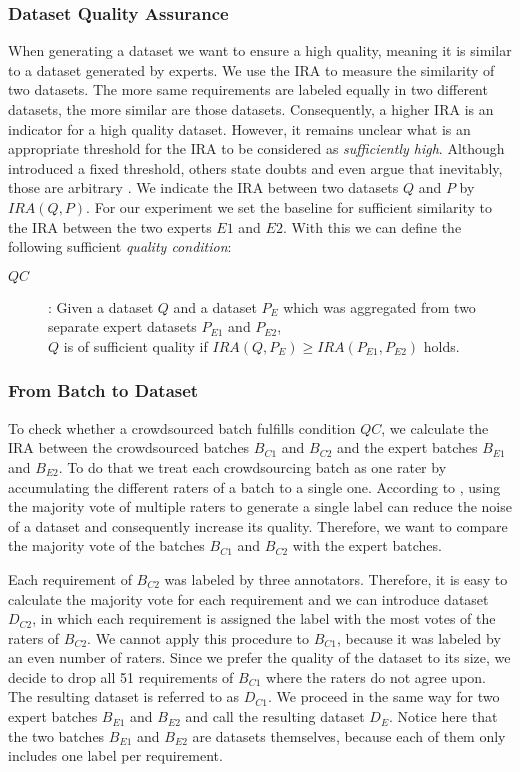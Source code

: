 \subsubsection{Dataset Quality Assurance}
When generating a dataset we want to ensure a high quality, meaning it is similar to a dataset generated by experts.
We use the \ac{IRA} to measure the similarity of two datasets.
The more same requirements are labeled equally in two different datasets, the more similar are those datasets.
Consequently, a higher \ac{IRA} is an indicator for a high quality dataset.
However, it remains unclear what is an appropriate threshold for the \ac{IRA} to be considered as \textit{sufficiently high}.
Although \textcite{Landis:1977} introduced a fixed threshold, others state doubts and even argue that inevitably, those are arbitrary \parencites{Dunn:1989}{Brennan:1992}.
We indicate the \ac{IRA} between two datasets $Q$ and $P$ by $IRA(Q, P)$.
For our experiment we set the baseline for sufficient similarity to the \ac{IRA} between the two experts $E1$ and $E2$.
With this we can define the following sufficient \textit{quality condition}:
\begin{description}
    \item[$QC$]: Given a dataset $Q$ and a dataset $P_E$ which was aggregated from two separate expert datasets $P_{E1}$ and $P_{E2}$,\\
    $Q$ is of sufficient quality if $IRA(Q, P_E) \ge IRA(P_{E1}, P_{E2})$ holds.
\end{description}

\subsubsection{From Batch to Dataset}
To check whether a crowdsourced batch fulfills condition $QC$, we calculate the \ac{IRA} between the crowdsourced batches $B_{C1}$ and $B_{C2}$ and the expert batches $B_{E1}$ and $B_{E2}$.
To do that we treat each crowdsourcing batch as one rater by accumulating the different raters of a batch to a single one.
According to \textcite{Nowak:2010}, using the majority vote of multiple raters to generate a single label can reduce the noise of a dataset and consequently increase its quality.
Therefore, we want to compare the majority vote of the batches $B_{C1}$ and $B_{C2}$ with the expert batches.

Each requirement of $B_{C2}$ was labeled by three annotators.
Therefore, it is easy to calculate the majority vote for each requirement and we can introduce dataset $D_{C2}$, in which each requirement is assigned the label with the most votes of the raters of $B_{C2}$.
We cannot apply this procedure to $B_{C1}$, because it was labeled by an even number of raters.
Since we prefer the quality of the dataset to its size, we decide to drop all 51 requirements of $B_{C1}$ where the raters do not agree upon.
The resulting dataset is referred to as $D_{C1}$.
We proceed in the same way for two expert batches $B_{E1}$ and $B_{E2}$ and call the resulting dataset $D_{E}$.
Notice here that the two batches $B_{E1}$ and $B_{E2}$ are datasets themselves, because each of them only includes one label per requirement.


